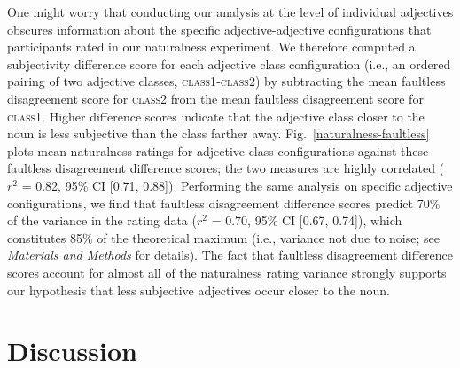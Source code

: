 \documentclass{pnastwo}
\begin{document}
\begin{article}

One might worry that conducting our analysis at the level of individual adjectives obscures information about the specific adjective-adjective configurations that participants rated in our naturalness experiment.
We therefore computed a subjectivity difference score for each adjective class configuration (i.e., an ordered pairing of two adjective classes, \textsc{class1}-\textsc{class2}) by subtracting the mean faultless disagreement score for \textsc{class2} from the mean faultless disagreement score for \textsc{class1}. Higher difference scores indicate that the adjective class closer to the noun is less subjective than the class farther away. Fig.~\ref{naturalness-faultless} plots mean naturalness ratings for adjective class configurations against these faultless disagreement difference scores; the two measures are highly correlated ($r^2$ = 0.82, 95\% CI [0.71, 0.88]). Performing the same analysis on specific adjective configurations, we find that faultless disagreement difference scores predict 70\% of the variance in the rating data ($r^2$ = 0.70, 95\% CI [0.67, 0.74]), which constitutes 85\% of the theoretical maximum (i.e., variance not due to noise; see \emph{Materials and Methods} for details). The fact that faultless disagreement difference scores account for almost all of the naturalness rating variance strongly supports our hypothesis that less subjective adjectives occur closer to the noun. 

\section{Discussion}


\end{article}
\end{document}
